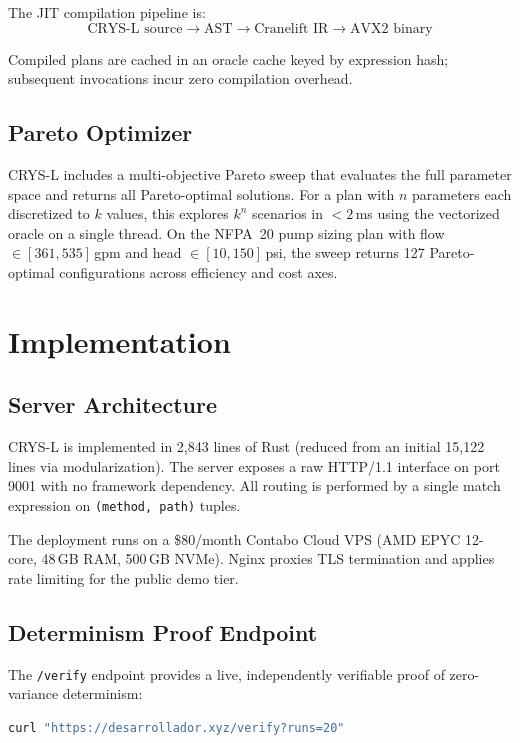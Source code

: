 \documentclass[10pt,twocolumn]{article}
\begin{document}
The JIT compilation pipeline is:
$$\text{CRYS-L source} \rightarrow \text{AST} \rightarrow \text{Cranelift IR} \rightarrow \text{AVX2 binary}$$

Compiled plans are cached in an oracle cache keyed by expression hash; subsequent
invocations incur zero compilation overhead.

\subsection{Pareto Optimizer}

CRYS-L includes a multi-objective Pareto sweep that evaluates the full parameter
space and returns all Pareto-optimal solutions. For a plan with $n$ parameters
each discretized to $k$ values, this explores $k^n$ scenarios in $< 2$\,ms
using the vectorized oracle on a single thread. On the NFPA~20 pump sizing plan
with flow $\in [361, 535]$\,gpm and head $\in [10, 150]$\,psi,
the sweep returns 127 Pareto-optimal configurations across efficiency and cost axes.

\section{Implementation}
\label{sec:impl}

\subsection{Server Architecture}

CRYS-L is implemented in 2{,}843 lines of Rust (reduced from an initial 15{,}122 lines
via modularization). The server exposes a raw HTTP/1.1 interface on port 9001 with no
framework dependency. All routing is performed by a single match expression on
\texttt{(method, path)} tuples.

The deployment runs on a \$80/month Contabo Cloud VPS (AMD EPYC 12-core, 48\,GB RAM,
500\,GB NVMe). Nginx proxies TLS termination and applies rate limiting for the
public demo tier.

\subsection{Determinism Proof Endpoint}

The \texttt{/verify} endpoint provides a live, independently verifiable proof of
zero-variance determinism:

\begin{lstlisting}[language=bash]
curl "https://desarrollador.xyz/verify?runs=20"
\end{lstlisting}
\end{document}
